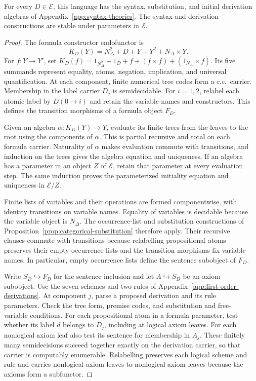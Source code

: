 \begin{proposition}\label{prop:fork-first-order-realization}
For every $D\in\mathcal E$, this language has the syntax,
substitution, and initial derivation algebras of
Appendix~\ref{app:syntax-theories}. The syntax and derivation
constructions are stable under parameters in $\mathcal E$.
\end{proposition}
\begin{proof}
The formula constructor endofunctor is
\[
 K_D(Y)=N_\Delta^2+D+Y+Y^2+N_\Delta\times Y.
\]
For $f:Y\to Y'$, set
$K_D(f)=1_{N_\Delta^2}+1_D+f+(f\times f)+(1_{N_\Delta}\times f)$.
Its five summands represent equality, atoms, negation, implication,
and universal quantification. At each component, finite numerical
tree codes form a c.e.\ carrier. Membership in the label carrier
$D_j$ is semidecidable.
For $i=1,2$, relabel each atomic label by $D(0\to i)$ and retain
the variable names and constructors. This defines the transition
morphisms of a formula object $F_D$.

Given an algebra $\alpha:K_D(Y)\to Y$, evaluate its finite trees
from the leaves to the root using the components of $\alpha$.
This is partial recursive and total on each formula carrier.
Naturality of $\alpha$ makes evaluation commute with transitions,
and induction on the trees gives the algebra equation and
uniqueness. If an algebra has a parameter in an object $Z$ of
$\mathcal E$, retain that parameter at every evaluation step.
The same induction proves the parameterized initiality equation
and uniqueness in $\mathcal E/Z$.

Finite lists of variables and their operations are formed
componentwise, with identity transitions on variable names.
Equality of variables is decidable because the variable object
is $N_\Delta$. The occurrence-list and substitution constructions
of Proposition~\ref{prop:categorical-substitution} therefore apply.
Their recursive clauses commute with transitions because relabelling
propositional atoms preserves their empty occurrence lists and the
transition morphisms fix variable names. In particular, empty occurrence lists
define the sentence subobject of $F_D$.

Write $S_D\hookrightarrow F_D$ for the sentence inclusion and let
$A\hookrightarrow S_D$ be an axiom subobject. Use the seven schemes
and two rules of Appendix~\ref{app:first-order-derivations}. At component
$j$, parse a proposed derivation and its rule parameters. Check the
tree form, premise codes, and substitution and free-variable conditions.
For each propositional atom in a formula parameter, test whether its
label $d$ belongs to $D_j$, including at logical axiom leaves. For each
nonlogical axiom leaf also test its sentence for membership in $A_j$.
These finitely many semidecisions succeed together exactly on the
derivation carrier, so that carrier is computably enumerable. Relabelling preserves
each logical scheme and rule and carries nonlogical axiom leaves to nonlogical
axiom leaves because the axioms form a subfunctor.


\end{proof}
